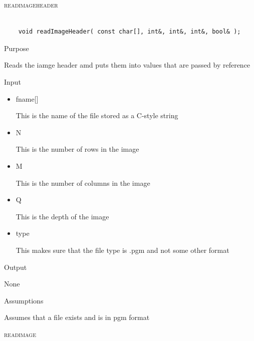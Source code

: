 \documentclass[pdftex, 11pt]{article}
\begin{document}
\begin{description}
	\item{\textsc{readimageheader}}

		\begin{lstlisting}

	void readImageHeader( const char[], int&, int&, int&, bool& );
		\end{lstlisting}

		\begin{description}
			\item{Purpose}

				Reads the iamge header amd puts them into values that
				are passed by reference

			\item{Input}

				\begin{itemize}

					\item{fname[]}

						This is the name of the file stored
						as a C-style string

					\item{N}

						This is the number of rows in the image

					\item{M}

						This is the number of columns in
						the image

					\item{Q}

						This is the depth of the image

					\item{type}

						This makes sure that the file type is
						.pgm and not some other format
						
				\end{itemize}
						
						
			\item{Output}

				None

			\item{Assumptions}

				Assumes that a file exists and is in pgm format

		\end{description}


	\item{\textsc{readimage}}

		\begin{lstlisting}


\end{lstlisting}
\end{description}
\end{document}

